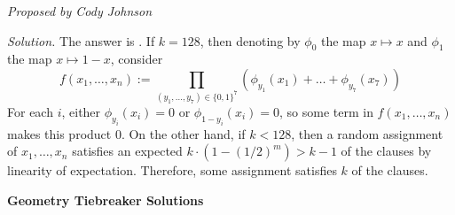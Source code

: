 \documentclass[10pt]{article}
\newcounter{enum}
\newcommand{\proposed}[1]
{
\vspace{5pt}
\noindent\textit{Proposed by #1}
}
\newcommand{\solution}
{
\vspace{5pt}
\noindent\textit{Solution.}\qquad
}
\begin{document}
\begin{enumerate}
\proposed{Cody Johnson}

\solution The answer is . If $k=128$, then denoting by $\phi_0$ the map $x\mapsto x$ and $\phi_1$ the map $x\mapsto1-x$, consider \[f(x_1,\dots,x_n):=\prod_{(y_1,\dots,y_7)\in\{0,1\}^7}(\phi_{y_1}(x_1)+\dots+\phi_{y_7}(x_7))\] For each $i$, either $\phi_{y_i}(x_i)=0$ or $\phi_{1-y_i}(x_i)=0$, so some term in $f(x_1,\dots,x_n)$ makes this product $0$. On the other hand, if $k<128$, then a random assignment of $x_1,\dots,x_n$ satisfies an expected $k\cdot\left(1-(1/2)^m\right)>k-1$ of the clauses by linearity of expectation. Therefore, some assignment satisfies $k$ of the clauses.

\end{enumerate}


\newpage

\begin{center}
\huge\textbf{Geometry Tiebreaker Solutions}
\end{center}
\end{document}
